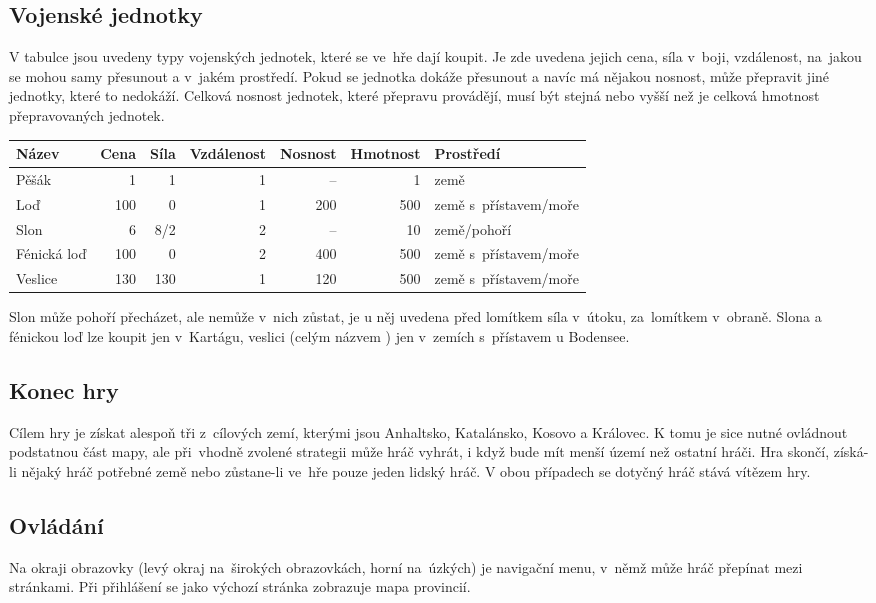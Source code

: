 \documentclass[a4paper,12pt]{article}
\begin{document}
\subsection{Vojenské jednotky}
V tabulce jsou uvedeny typy vojenských jednotek, které se ve~hře dají koupit. Je zde uvedena jejich cena, síla v~boji, vzdálenost, na~jakou se mohou samy přesunout a v~jakém prostředí. Pokud se jednotka dokáže přesunout a navíc má nějakou nosnost, může přepravit jiné jednotky, které to nedokáží. Celková nosnost jednotek, které přepravu provádějí, musí být stejná nebo vyšší než je celková hmotnost přepravovaných jednotek.

\begin{tabular}{l r r r r r l}
Název		& Cena	& Síla	& Vzdálenost	&Nosnost& Hmotnost	& Prostředí\\ \hline
Pěšák		& 1		& 1		& 1			& --		& 1			& země\\
Loď			& 100	& 0		& 1			& 200	& 500		& země s~přístavem/moře\\
Slon			& 6		& 8/2	& 2			& --		& 10			& země/pohoří\\
Fénická loď	& 100	& 0		& 2			& 400	& 500		& země s~přístavem/moře\\
Veslice		& 130	& 130	& 1			& 120	& 500		& země s~přístavem/moře\\
\end{tabular}

Slon může pohoří přecházet, ale nemůže v~nich zůstat, je u něj uvedena před lomítkem síla v~útoku, za~lomítkem v~obraně. Slona a fénickou loď lze koupit jen v~Kartágu, veslici (celým názvem ) jen v~zemích s~přístavem u Bodensee.
\subsection{Konec hry}
Cílem hry je získat alespoň tři z~cílových zemí, kterými jsou Anhaltsko, Katalánsko, Kosovo a Královec. K tomu je sice nutné ovládnout podstatnou část mapy, ale při~vhodně zvolené strategii může hráč vyhrát, i když bude mít menší území než ostatní hráči. Hra skončí, získá-li nějaký hráč potřebné země nebo zůstane-li ve~hře pouze jeden lidský hráč. V obou případech se dotyčný hráč stává vítězem hry.
\subsection{Ovládání}
Na okraji obrazovky (levý okraj na~širokých obrazovkách, horní na~úzkých) je navigační menu, v~němž může hráč přepínat mezi stránkami. Při přihlášení se jako výchozí stránka zobrazuje mapa provincií.
\end{document}
